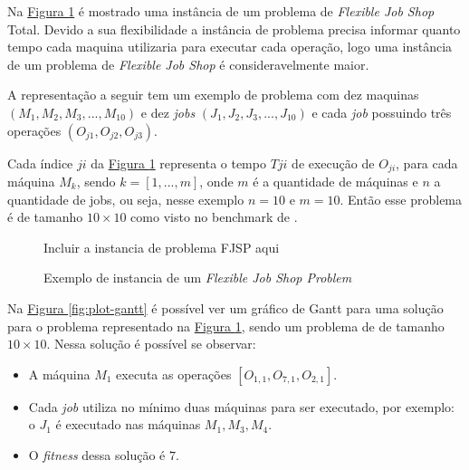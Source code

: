             Na 
            \hyperref[fig:ex-instancia-problema-FJSP]{Figura \ref{fig:ex-instancia-problema-FJSP}} 
            é mostrado uma instância de um problema de \textit{Flexible Job Shop} Total. Devido a sua flexibilidade a instância de problema precisa informar quanto tempo cada maquina utilizaria para executar cada operação, logo uma instância de um problema de \textit{Flexible Job Shop} é consideravelmente maior.\hfill\vspace{\onelineskip}

            A representação a seguir tem um exemplo de problema com dez maquinas $(M_1, M_2, M_3, ..., M_{10})$ e dez \textit{jobs} $(J_1, J_2, J_3, ..., J_{10})$ e cada \textit{job} possuindo três operações $(O_{j1}, O_{j2}, O_{j3})$.\hfill\vspace{\onelineskip}

            Cada índice $ji$ da 
            \hyperref[fig:ex-instancia-problema-FJSP]{Figura \ref{fig:ex-instancia-problema-FJSP}} 
            representa o tempo $T{ji}$ de execução de $O_{ji}$, para cada máquina $M_k$, 
            sendo $k=[1, ..., m]$, onde $m$ é a quantidade de máquinas e $n$ a quantidade de jobs, ou seja, nesse exemplo $n=10$ e $m=10$.\newline
            Então esse problema é de tamanho $10\times10$ como visto no benchmark de \cite{Kacem2002}.\hfill

            \begin{figure}[ht]
                \centering
                \small{Incluir a instancia de problema FJSP aqui}
                \caption{Exemplo de instancia de um \textit{Flexible Job Shop Problem}}
                \label{fig:ex-instancia-problema-FJSP}
            \end{figure}



            Na 
            \hyperref[fig:plot-gantt]{Figura \ref{fig:plot-gantt}} 
            é possível ver um gráfico de Gantt para uma solução para o problema representado na 
            \hyperref[fig:ex-instancia-problema-FJSP]{Figura \ref{fig:ex-instancia-problema-FJSP}}, 
            sendo um problema de \cite{Kacem2002} de tamanho $10\times10$. Nessa solução é possível se observar:
            \begin{itemize}
                \item A máquina $M_1$ executa as operações $[O_{1,1}, O_{7,1}, O_{2,1}]$.
                \item Cada \textit{job} utiliza no mínimo duas máquinas para ser executado, por exemplo: o $J_1$ é executado nas máquinas $M_1 , M_3, M_4$.
                \item O \textit{fitness} dessa solução é $7$.
            \end{itemize}
            

